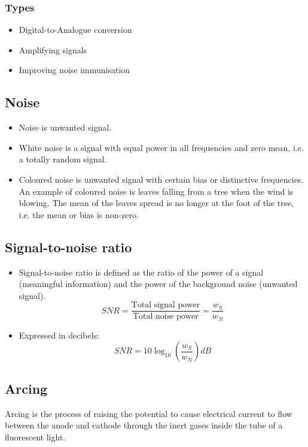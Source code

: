 \documentclass[11pt]{article}
\begin{document}
\subsubsection{Types}
\label{sec:org6e6afd8}
\begin{itemize}
\item Digital-to-Analogue conversion
\item Amplifying signals
\item Improving noise immunisation
\end{itemize}

\subsection{Noise}
\label{sec:org32efcb7}
\begin{itemize}
\item Noise is unwanted signal.
\item White noise is a signal with equal power in all frequencies and zero mean, i.e. a totally random signal.
\item Coloured noise is unwanted signal with certain bias or distinctive frequencies. An example of coloured noise is leaves falling from a tree when the wind is blowing. The mean of the leaves spread is no longer at the foot of the tree, i.e. the mean or bias is non-zero.
\end{itemize}

\subsection{Signal-to-noise ratio}
\label{sec:org3d3a8cb}
\begin{itemize}
\item Signal-to-noise ratio is defined as the ratio of the power of a signal (meaningful information) and the power of the background noise (unwanted signal).
\[SNR = \frac{\text{Total signal power}}{\text{Total noise power}} = \frac{w_S}{w_N}\]
\item Expressed in decibels:
\[SNR = 10 \log_{10} \left(\frac{w_S}{w_N} \right) \unit{dB}\]
\end{itemize}

\subsection{Arcing}
\label{sec:orgf52691e}
Arcing is the process of raising the potential to cause electrical current to flow between the anode and cathode through the inert gases inside the tube of a fluorescent light.
\end{document}
